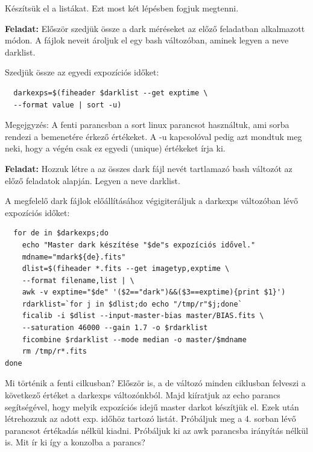 \documentclass{article}
\begin{document}
Készítsük el a listákat. Ezt most két lépésben fogjuk megtenni.

{\bf Feladat:}
Először szedjük össze a dark méréseket az előző feladatban alkalmazott módon.
A fájlok neveit ároljuk el egy bash változóban, aminek legyen a neve darklist.

Szedjük össze az egyedi expozíciós időket:
\begin{verbatim}
  darkexps=$(fiheader $darklist --get exptime \
  --format value | sort -u)
\end{verbatim}

Megejgyzés: A fenti parancsban a sort linux parancsot használtuk, ami sorba
rendezi a bemenetére érkező értékeket. A -u kapcsolóval pedig azt mondtuk meg
neki, hogy a végén csak ez egyedi (unique) értékeket írja ki.

{\bf Feladat:}
Hozzuk létre a az összes dark fájl nevét tartlamazó bash változót az előző
feladatok alapján. Legyen a neve darklist.

A megfelelő dark fájlok előállításához végigiteráljuk a darkexps változóban lévő
expozíciós időket:

\begin{verbatim}
  for de in $darkexps;do
    echo "Master dark készítése "$de"s expozíciós idővel."
    mdname="mdark${de}.fits"
    dlist=$(fiheader *.fits --get imagetyp,exptime \
    --format filename,list | \
    awk -v exptime="$de" '($2=="dark")&&($3==exptime){print $1}')
    rdarklist=`for j in $dlist;do echo "/tmp/r"$j;done`
    ficalib -i $dlist --input-master-bias master/BIAS.fits \
    --saturation 46000 --gain 1.7 -o $rdarklist
    ficombine $rdarklist --mode median -o master/$mdname
    rm /tmp/r*.fits
done
\end{verbatim}

Mi történik a fenti cilkusban? Először is, a de változó minden ciklusban
felveszi a következő értéket a darkexps változónkból. Majd kiíratjuk az echo
parancs segítségével, hogy melyik expozíciós idejű master darkot készítjük el.
Ezek után létrehozzuk az adott exp. időhöz tartozó listát. Próbáljuk meg a 4.
sorban lévő parancsot értékadás nélkül kiadni. Próbáljuk ki az awk parancsba
irányítás nélkül is. Mit ír ki így a konzolba a parancs?
\end{document}
